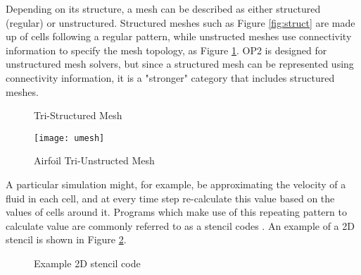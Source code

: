 \clearpage
Depending on its structure, a mesh can be described as either structured (regular) or unstructured. Structured meshes such as Figure \ref{fig:struct} are made up of cells following a regular pattern, while unstructed meshes use connectivity information to specify the mesh topology, as Figure \ref{fig:umesh}. OP2 is designed for unstructured mesh solvers, but since a structured mesh can be represented using connectivity information, it is a "stronger" category that includes structured meshes.
\vspace{.5cm}
\begin{figure}[h!]
  \begin{minipage}{.5\textwidth}
    \centering
    \caption{Tri-Structured Mesh}
    \label{fig:struct}
  \end{minipage}
  \begin{minipage}{.5\textwidth}
    \centering
    \texttt{[image: umesh]}
    \caption{Airfoil Tri-Unstructed Mesh}
    \label{fig:umesh}
  \end{minipage}
\end{figure}
\par
A particular simulation might, for example, be approximating the velocity of a fluid in each cell, and at every time step re-calculate this value based on the values of cells around it. Programs which make use of this repeating pattern to calculate value are commonly referred to as a stencil codes \cite{stencil}. An example of a 2D stencil is shown in Figure \ref{fig:stencil}.
\vspace{.5cm}
\begin{figure}[h!]
  \centering
{}
\caption{Example 2D stencil code}
\label{fig:stencil}
\end{figure}

